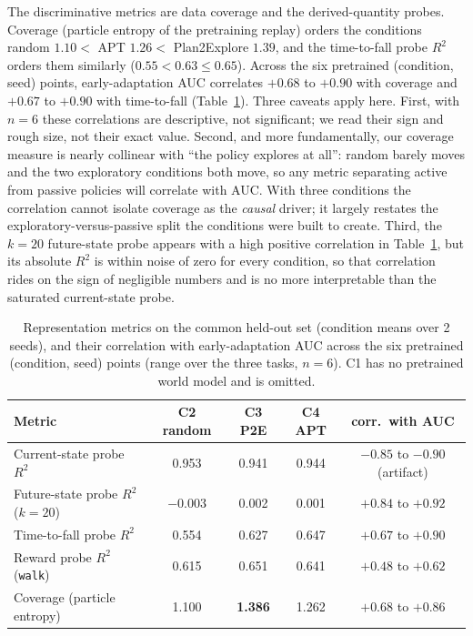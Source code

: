 \documentclass{article}
\begin{document}
The discriminative metrics are data coverage and the derived-quantity probes.
Coverage (particle entropy of the pretraining replay) orders the conditions
random $1.10 <$ APT $1.26 <$ Plan2Explore $1.39$, and the time-to-fall probe
$R^2$ orders them similarly ($0.55 < 0.63 \le 0.65$). Across the six pretrained
(condition, seed) points, early-adaptation AUC correlates $+0.68$ to $+0.90$
with coverage and $+0.67$ to $+0.90$ with time-to-fall (Table~\ref{tab:repr}).
Three caveats apply here. First, with $n=6$ these correlations are descriptive,
not significant; we read their sign and rough size, not their exact value.
Second, and more fundamentally, our coverage measure is nearly collinear with
``the policy explores at all'': random barely moves and the two exploratory
conditions both move, so any metric separating active from passive policies will
correlate with AUC. With three conditions the correlation cannot isolate
coverage as the \emph{causal} driver; it largely restates the
exploratory-versus-passive split the conditions were built to create. Third, the
$k{=}20$ future-state probe appears with a high positive correlation in
Table~\ref{tab:repr}, but its absolute $R^2$ is within noise of zero for every
condition, so that correlation rides on the sign of negligible numbers and is no
more interpretable than the saturated current-state probe.

\begin{table}[t]
\centering
\caption{Representation metrics on the common held-out set (condition means
over 2 seeds), and their correlation with early-adaptation AUC across the six
pretrained (condition, seed) points (range over the three tasks, $n=6$). C1 has
no pretrained world model and is omitted.}
\label{tab:repr}
\begin{tabular}{lcccc}
\toprule
Metric & C2 random & C3 P2E & C4 APT & corr.\ with AUC \\
\midrule
Current-state probe $R^2$        & 0.953 & 0.941 & 0.944 & $-0.85$ to $-0.90$ (artifact) \\
Future-state probe $R^2$ ($k{=}20$) & $-0.003$ & 0.002 & 0.001 & $+0.84$ to $+0.92$ \\
Time-to-fall probe $R^2$         & 0.554 & 0.627 & 0.647 & $+0.67$ to $+0.90$ \\
Reward probe $R^2$ (\texttt{walk}) & 0.615 & 0.651 & 0.641 & $+0.48$ to $+0.62$ \\
Coverage (particle entropy)      & 1.100 & \textbf{1.386} & 1.262 & $+0.68$ to $+0.86$ \\
\bottomrule
\end{tabular}
\end{table}
\end{document}
